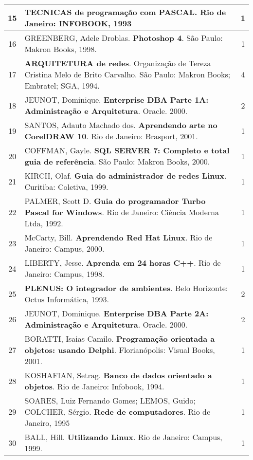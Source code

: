 \begin{longtable}{|c|p{115mm}|c|}
15     & \textbf{TECNICAS de programação com PASCAL}. Rio de Janeiro: INFOBOOK, 1993            & 1          \\ \hline
16     & GREENBERG, Adele Droblas. \textbf{Photoshop 4}. São Paulo: Makron Books, 1998.        & 1          \\ \hline
17     & \textbf{ARQUITETURA de redes}. Organização de Tereza Cristina Melo de Brito Carvalho. São Paulo: Makron Books; Embratel; SGA, 1994. & 4          \\ \hline
18     & JEUNOT, Dominique. \textbf{Enterprise DBA Parte 1A: Administração e Arquitetura}. Oracle. 2000.& 2          \\ \hline
19     & SANTOS, Adauto Machado dos. \textbf{Aprendendo arte no CorelDRAW 10}. Rio de Janeiro: Brasport, 2001. & 1          \\ \hline
20     & COFFMAN, Gayle. \textbf{SQL SERVER 7: Completo e total guia de referência}. São Paulo: Makron Books, 2000. & 1          \\ \hline
21     & KIRCH, Olaf. \textbf{Guia do administrador de redes Linux}. Curitiba: Coletiva, 1999.          & 1          \\ \hline
22     & PALMER, Scott D. \textbf{Guia do programador Turbo Pascal for Windows}. Rio de Janeiro: Ciência Moderna Ltda, 1992. & 1          \\ \hline
23     & McCarty, Bill. \textbf{Aprendendo Red Hat Linux}. Rio de Janeiro: Campus, 2000.       & 1          \\ \hline
24     & LIBERTY, Jesse. \textbf{Aprenda em 24 horas C++}. Rio de Janeiro: Campus, 1998.       & 1          \\ \hline
25     & \textbf{PLENUS: O integrador de ambientes}. Belo Horizonte: Octus Informática, 1993.  & 2          \\ \hline
26     & JEUNOT, Dominique. \textbf{Enterprise DBA Parte 2A: Administração e Arquitetura}. Oracle. 2000. & 2          \\ \hline
27     & BORATTI, Isaias Camilo. \textbf{Programação orientada a objetos: usando Delphi}. Florianópolis: Visual Books, 2001. & 1          \\ \hline
28     & KOSHAFIAN, Setrag. \textbf{Banco de dados orientado a objetos}. Rio de Janeiro: Infobook, 1994.& 1          \\ \hline
29     & SOARES, Luiz Fernando Gomes; LEMOS, Guido; COLCHER, Sérgio. \textbf{Rede de computadores}. Rio de Janeiro, 1995 & 1 \\ \hline
30     & BALL, Hill. \textbf{Utilizando Linux}. Rio de Janeiro: Campus, 1999.                  & 1          \\ \hline

\end{longtable}
